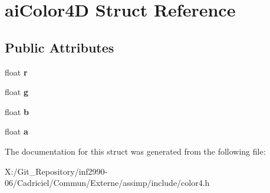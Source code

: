 \hypertarget{structai_color4_d}{\section{ai\-Color4\-D Struct Reference}
\label{structai_color4_d}
}
\subsection*{Public Attributes}
\begin{DoxyCompactItemize}
\item 
\hypertarget{structai_color4_d_a989c2117cfae5a4457fa65f0257e93c7}{float {\bfseries r}}\label{structai_color4_d_a989c2117cfae5a4457fa65f0257e93c7}

\item 
\hypertarget{structai_color4_d_a32e929c7db12fb6f79f74a611f6d8fe6}{float {\bfseries g}}\label{structai_color4_d_a32e929c7db12fb6f79f74a611f6d8fe6}

\item 
\hypertarget{structai_color4_d_ab64376fc730371f8952f5f98084b2430}{float {\bfseries b}}\label{structai_color4_d_ab64376fc730371f8952f5f98084b2430}

\item 
\hypertarget{structai_color4_d_a1bf4f719c14e844dcd7ce5a1c1969c89}{float {\bfseries a}}\label{structai_color4_d_a1bf4f719c14e844dcd7ce5a1c1969c89}

\end{DoxyCompactItemize}


The documentation for this struct was generated from the following file\-:\begin{DoxyCompactItemize}
\item 
X\-:/\-Git\-\_\-\-Repository/inf2990-\/06/\-Cadriciel/\-Commun/\-Externe/assimp/include/color4.\-h\end{DoxyCompactItemize}
